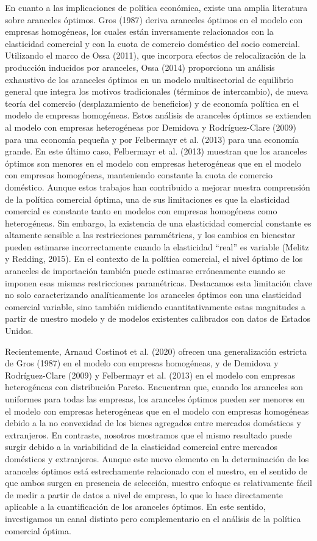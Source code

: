 \documentclass[10pt,a4paper]{article}
\begin{document}
En cuanto a las implicaciones de política económica, existe una amplia literatura sobre aranceles óptimos. Gros (1987) deriva aranceles óptimos en el modelo con empresas homogéneas, los cuales están inversamente relacionados con la elasticidad comercial y con la cuota de comercio doméstico del socio comercial. Utilizando el marco de Ossa (2011), que incorpora efectos de relocalización de la producción inducidos por aranceles, Ossa (2014) proporciona un análisis exhaustivo de los aranceles óptimos en un modelo multisectorial de equilibrio general que integra los motivos tradicionales (términos de intercambio), de nueva teoría del comercio (desplazamiento de beneficios) y de economía política en el modelo de empresas homogéneas. Estos análisis de aranceles óptimos se extienden al modelo con empresas heterogéneas por Demidova y Rodríguez-Clare (2009) para una economía pequeña y por Felbermayr et al. (2013) para una economía grande. En este último caso, Felbermayr et al. (2013) muestran que los aranceles óptimos son menores en el modelo con empresas heterogéneas que en el modelo con empresas homogéneas, manteniendo constante la cuota de comercio doméstico. Aunque estos trabajos han contribuido a mejorar nuestra comprensión de la política comercial óptima, una de sus limitaciones es que la elasticidad comercial es constante tanto en modelos con empresas homogéneas como heterogéneas. Sin embargo, la existencia de una elasticidad comercial constante es altamente sensible a las restricciones paramétricas, y los cambios en bienestar pueden estimarse incorrectamente cuando la elasticidad “real” es variable (Melitz y Redding, 2015). En el contexto de la política comercial, el nivel óptimo de los aranceles de importación también puede estimarse erróneamente cuando se imponen esas mismas restricciones paramétricas. Destacamos esta limitación clave no solo caracterizando analíticamente los aranceles óptimos con una elasticidad comercial variable, sino también midiendo cuantitativamente estas magnitudes a partir de nuestro modelo y de modelos existentes calibrados con datos de Estados Unidos.

Recientemente, Arnaud Costinot et al. (2020) ofrecen una generalización estricta de Gros (1987) en el modelo con empresas homogéneas, y de Demidova y Rodríguez-Clare (2009) y Felbermayr et al. (2013) en el modelo con empresas heterogéneas con distribución Pareto. Encuentran que, cuando los aranceles son uniformes para todas las empresas, los aranceles óptimos pueden ser menores en el modelo con empresas heterogéneas que en el modelo con empresas homogéneas debido a la no convexidad de los bienes agregados entre mercados domésticos y extranjeros. En contraste, nosotros mostramos que el mismo resultado puede surgir debido a la variabilidad de la elasticidad comercial entre mercados domésticos y extranjeros. Aunque este nuevo elemento en la determinación de los aranceles óptimos está estrechamente relacionado con el nuestro, en el sentido de que ambos surgen en presencia de selección, nuestro enfoque es relativamente fácil de medir a partir de datos a nivel de empresa, lo que lo hace directamente aplicable a la cuantificación de los aranceles óptimos. En este sentido, investigamos un canal distinto pero complementario en el análisis de la política comercial óptima.
\end{document}
